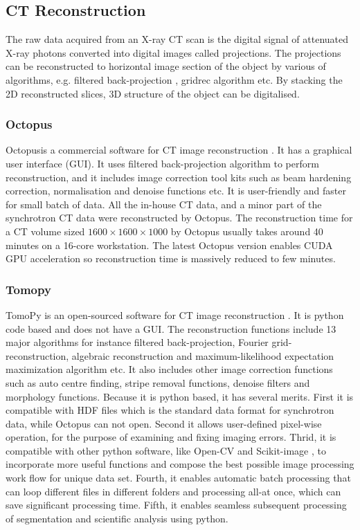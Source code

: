 \subsection{CT Reconstruction}
The raw data acquired from an X-ray CT scan is the digital signal of attenuated X-ray photons converted into digital images called projections. The projections can be reconstructed to horizontal image section of the object by various of algorithms, e.g. filtered back-projection\citep{kak2002principles} , gridrec algorithm \citep{marone2012regridding,dowd1999developments} etc. By stacking the 2D reconstructed slices, 3D structure of the object can be digitalised.

\subsubsection{Octopus}
Octopus\texttrademark is a commercial software for CT image reconstruction \citep{vlassenbroeck2006octopus}. It has a graphical user interface (GUI).  It uses filtered back-projection algorithm to perform reconstruction, and it includes image correction tool kits such as beam hardening correction, normalisation and denoise functions etc. It is user-friendly and faster for small batch of data. All the in-house CT data, and a minor part of the synchrotron CT data were reconstructed by Octopus. The reconstruction time for a CT volume sized $1600 \times 1600 \times 1000$ by Octopus usually takes around 40 minutes on a 16-core workstation. The latest Octopus version enables CUDA GPU acceleration so reconstruction time is massively reduced to few minutes.

\subsubsection{Tomopy}
TomoPy is an open-sourced software for CT image reconstruction \citep{gursoy2014tomopy}. It is python code based and does not have a GUI. The reconstruction functions include 13 major algorithms for instance filtered back-projection, Fourier grid-reconstruction, algebraic reconstruction and maximum-likelihood expectation maximization algorithm etc. It also includes other image correction functions such as auto centre finding, stripe removal functions, denoise filters and morphology functions. Because it is python based, it has several merits. First it is compatible with HDF files which is the standard data format for synchrotron data, while Octopus can not open. Second it allows user-defined pixel-wise operation, for the purpose of examining and fixing imaging errors. Thrid, it is compatible with other python software, like Open-CV \citep{opencv_library} and Scikit-image \citep{scikit-image}, to incorporate more useful functions and compose the best possible image processing work flow for unique data set. Fourth, it enables automatic batch processing that can loop different files in different folders and processing all-at once, which can save significant processing time. Fifth, it enables seamless subsequent processing of segmentation and scientific analysis using python.

